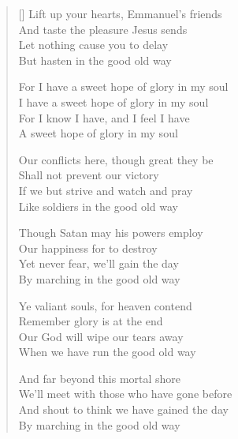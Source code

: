 \begin{verse}[\versewidth]
Lift up your hearts, Emmanuel's friends\\
And taste the pleasure Jesus sends\\
Let nothing cause you to delay\\
But hasten in the good old way

\begin{chorus}
    For I have a sweet hope of glory in my soul\\
    I have a sweet hope of glory in my soul\\
    For I know I have, and I feel I have\\
    A sweet hope of glory in my soul
    \end{chorus}

Our conflicts here, though great they be\\
Shall not prevent our victory\\
If we but strive and watch and pray\\
Like soldiers in the good old way

Though Satan may his powers employ\\
Our happiness for to destroy\\
Yet never fear, we'll gain the day\\
By marching in the good old way

Ye valiant souls, for heaven contend\\
Remember glory is at the end\\
Our God will wipe our tears away\\
When we have run the good old way

And far beyond this mortal shore\\
We'll meet with those who have gone before\\
And shout to think we have gained the day\\
By marching in the good old way
\end{verse}
